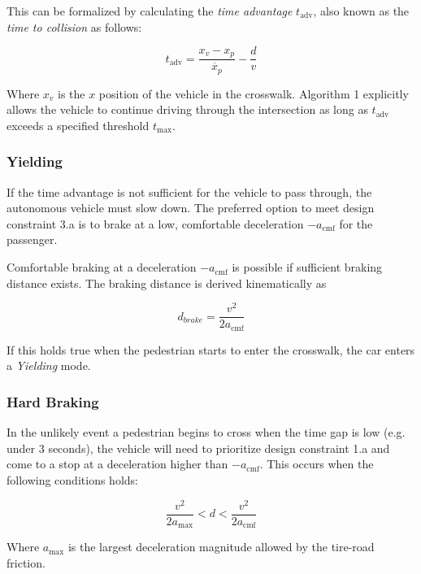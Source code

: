 \documentclass[letterpaper, 10 pt, conference]{ieeeconf}  %
\begin{document}
This can be formalized by calculating the \textit{time advantage} $t_\mathrm{adv}$, also known as the \textit{time to collision} as follows:

\begin{equation}
t_\mathrm{adv} = \frac{x_v - x_p}{\dot{x_p}} - \frac{d}{v}
\end{equation}

Where $x_v$ is the $x$ position of the vehicle in the crosswalk. Algorithm 1 explicitly allows the vehicle to continue driving through the intersection as long as $t_\mathrm{adv}$ exceeds a specified threshold $t_\mathrm{max}$. 

\subsubsection{Yielding}

If the time advantage is not sufficient for the vehicle to pass through, the autonomous vehicle must slow down. The preferred option to meet design constraint 3.a is to brake at a low, comfortable deceleration $-a_\mathrm{cmf}$ for the passenger.

Comfortable braking at a deceleration $-a_\mathrm{cmf}$ is possible if sufficient braking distance exists. The braking distance is derived kinematically as 

\begin{equation}
d_{brake} = \frac{v^2}{2a_\mathrm{cmf}}
\end{equation}

If this holds true when the pedestrian starts to enter the crosswalk, the car enters a \textit{Yielding} mode. 

\subsubsection{Hard Braking}

In the unlikely event a pedestrian begins to cross when the time gap is low (e.g. under 3 seconds), the vehicle will need to prioritize design constraint 1.a and come to a stop at a deceleration higher than $-a_\mathrm{cmf}$. This occurs when the following conditions holds:

\begin{equation}
\frac{v^2}{2a_\mathrm{max}} < d < \frac{v^2}{2a_\mathrm{cmf}}
\end{equation}

Where $a_\mathrm{max}$ is the largest deceleration magnitude allowed by the tire-road friction. 
\end{document}
